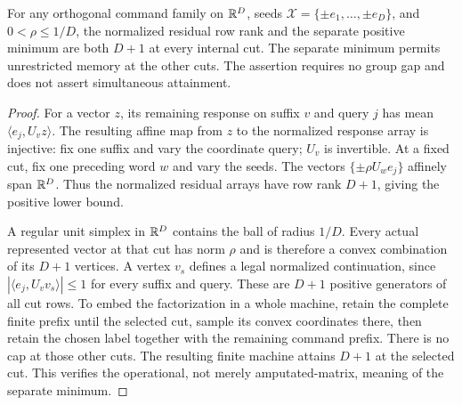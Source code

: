 \begin{proposition}
\label{prop:separate-width39}
For any orthogonal command family on $\mathbb R^D$, seeds
$\mathcal X=\{\pm e_1,\ldots,\pm e_D\}$, and $0<\rho\le1/D$,
the normalized residual row rank and the separate positive minimum
are both $D+1$ at every internal cut. The separate minimum permits
unrestricted memory at the other cuts. The assertion requires no
group gap and does not assert simultaneous attainment.
\end{proposition}
\begin{proof}
For a vector $z$, its remaining response on suffix $v$ and query $j$
has mean $\langle e_j,U_vz\rangle$. The resulting affine map from $z$
to the normalized response array is injective: fix one suffix and
vary the coordinate query; $U_v$ is invertible. At a fixed cut, fix
one preceding word $w$ and vary the seeds. The vectors
$\{\pm\rho U_we_j\}$ affinely span $\mathbb R^D$. Thus the normalized
residual arrays have row rank $D+1$, giving the positive lower bound.

A regular unit simplex in $\mathbb R^D$ contains the ball of radius $1/D$.
Every actual represented vector at that cut has norm $\rho$ and is
therefore a convex combination of its $D+1$ vertices. A vertex
$v_s$ defines a legal normalized continuation, since
$|\langle e_j,U_vv_s\rangle|\le1$ for every suffix and query.
These are $D+1$ positive generators of all cut rows. To embed the
factorization in a whole machine, retain the complete finite prefix
until the selected cut, sample its convex coordinates there, then
retain the chosen label together with the remaining command prefix.
There is no cap at those other cuts. The resulting finite machine
attains $D+1$ at the selected cut. This verifies the operational,
not merely amputated-matrix, meaning of the separate minimum.
\end{proof}
